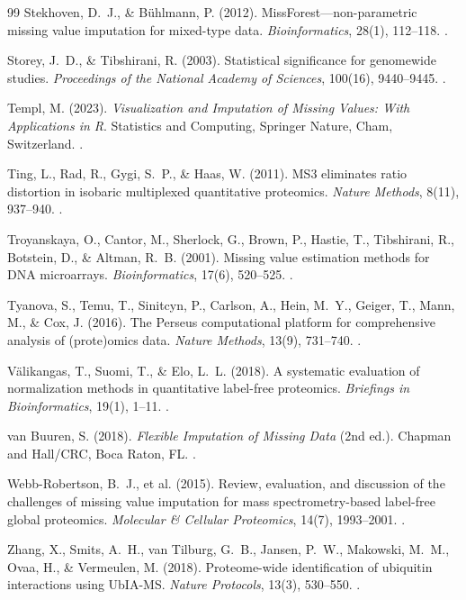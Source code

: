 \documentclass[11pt,oneside]{book}
\begin{document}
\begin{thebibliography}{99}
Stekhoven, D.~J., \& B\"uhlmann, P. (2012). MissForest---non-parametric missing value imputation for mixed-type data. \textit{Bioinformatics}, 28(1), 112--118. .

Storey, J.~D., \& Tibshirani, R. (2003). Statistical significance for genomewide studies. \textit{Proceedings of the National Academy of Sciences}, 100(16), 9440--9445. .

Templ, M. (2023). \textit{Visualization and Imputation of Missing Values: With Applications in R}. Statistics and Computing, Springer Nature, Cham, Switzerland. .

Ting, L., Rad, R., Gygi, S.~P., \& Haas, W. (2011). MS3 eliminates ratio distortion in isobaric multiplexed quantitative proteomics. \textit{Nature Methods}, 8(11), 937--940. .

Troyanskaya, O., Cantor, M., Sherlock, G., Brown, P., Hastie, T., Tibshirani, R., Botstein, D., \& Altman, R.~B. (2001). Missing value estimation methods for DNA microarrays. \textit{Bioinformatics}, 17(6), 520--525. .

Tyanova, S., Temu, T., Sinitcyn, P., Carlson, A., Hein, M.~Y., Geiger, T., Mann, M., \& Cox, J. (2016). The Perseus computational platform for comprehensive analysis of (prote)omics data. \textit{Nature Methods}, 13(9), 731--740. .

V\"alikangas, T., Suomi, T., \& Elo, L.~L. (2018). A systematic evaluation of normalization methods in quantitative label-free proteomics. \textit{Briefings in Bioinformatics}, 19(1), 1--11. .

van Buuren, S. (2018). \textit{Flexible Imputation of Missing Data} (2nd ed.). Chapman and Hall/CRC, Boca Raton, FL. .

Webb-Robertson, B.~J., et al. (2015). Review, evaluation, and discussion of the challenges of missing value imputation for mass spectrometry-based label-free global proteomics. \textit{Molecular \& Cellular Proteomics}, 14(7), 1993--2001. .

Zhang, X., Smits, A.~H., van Tilburg, G.~B., Jansen, P.~W., Makowski, M.~M., Ovaa, H., \& Vermeulen, M. (2018). Proteome-wide identification of ubiquitin interactions using UbIA-MS. \textit{Nature Protocols}, 13(3), 530--550. .

\end{thebibliography}
\end{document}
